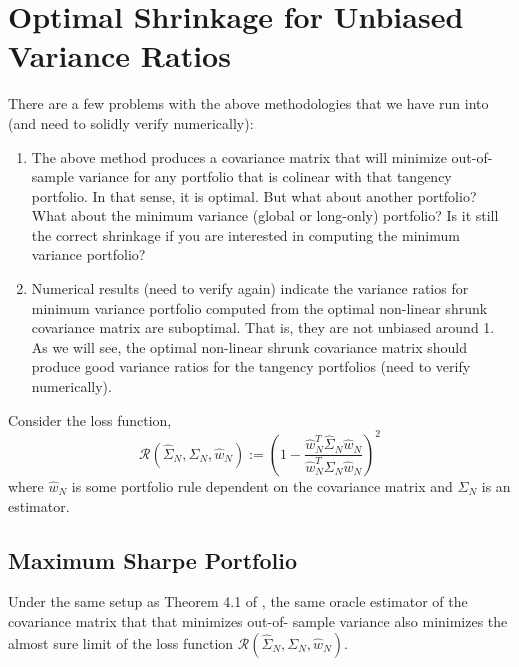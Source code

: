 \documentclass{article}
\begin{document}
\section{Optimal Shrinkage for Unbiased Variance Ratios}



There are a few problems with the above methodologies that we have run into (and
need to solidly verify numerically):
\begin{enumerate}
	\item The above method produces a covariance matrix that will minimize out-of-
	sample variance for any portfolio that is colinear with that tangency
	portfolio.  In that sense, it is optimal.  But what about another portfolio?
	What about the minimum variance (global or long-only) portfolio?  Is it still
	the correct shrinkage if you are interested in computing the minimum variance
	portfolio?

	\item Numerical results (need to verify again) indicate the variance ratios
	for minimum variance portfolio computed from the optimal non-linear shrunk
	covariance matrix are suboptimal.  That is, they are not unbiased around 1.  
  As we will see, the optimal non-linear shrunk covariance matrix should produce
  good variance ratios for the tangency portfolios (need to verify numerically).


\end{enumerate}

Consider the loss function,
$$
	\mathcal{R}(\hat{\Sigma}_N, \Sigma_N, \hat{w}_N)
		:= \left(
			1 - \frac{\hat{w}_N^T \hat{\Sigma}_N \hat{w}_N} {\hat{w}_N^T \Sigma_N \hat{w}_N}
			\right)^2
$$
where $\hat{w}_N$ is some portfolio rule dependent on the covariance matrix
and $\hat{\Sigma}_N$ is an estimator.

\subsection{Maximum Sharpe Portfolio}

\begin{thm} Under the same setup as Theorem 4.1 of \cite{Ledoit2017Nonlinear},
	the same oracle estimator of the covariance matrix that that minimizes out-of-
	sample variance also minimizes the almost sure limit of the loss function
	$\mathcal{R}(\hat{\Sigma}_N, \Sigma_N, \hat{w}_N)$.
\end{thm}
\end{document}
